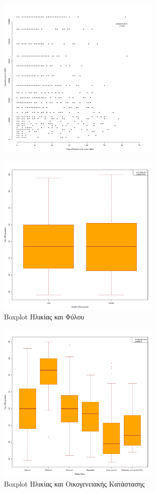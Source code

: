 \documentclass[10pt, letterpaper]{article}
\begin{document}
\begin{center}
\begin{figure}[h]
                \includegraphics[width=300px, keepaspectratio]{resources/YearsOfResidence_Income_Plot.png}
            \end{figure}
            \newpage
            \begin{figure}[h]
                \caption{Boxplot Ηλικίας και Φύλου}
                \label{agegenderplot}
                \centering
                \includegraphics[width=300px, keepaspectratio]{resources/Age_Gender_Plot.png}
            \end{figure}
            \newpage
            \begin{figure}[h]
                \caption{Boxplot Ηλικίας και Οικογενειακής Κατάστασης}
                \label{agemaritalplot}
                \centering
                \includegraphics[width=300px, keepaspectratio]{resources/Age_MaritalStatus_Plot.png}

\end{figure}
\end{center}
\end{document}
